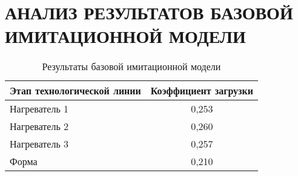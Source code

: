 \section[Анализ результатов базовой имитационной модели]{
  АНАЛИЗ РЕЗУЛЬТАТОВ БАЗОВОЙ \\
  ИМИТАЦИОННОЙ МОДЕЛИ}

\begin{table}[h!]
  \caption{Результаты базовой имитационной модели}
  \label{tbl:base_result}
    \centering
    \small{
    \begin{tabular}{| p{} | c |}
      \hline
      Этап технологической линии & 
      Коэффициент загрузки \\
      \hline

      Нагреватель 1 &
      0{,}253 \\
      \hline

      Нагреватель 2 &
      0{,}260 \\
      \hline

      Нагреватель 3 &
      0{,}257 \\
      \hline

      Форма &
      0{,}210 \\
      \hline

    \end{tabular}
    }
\end{table}
